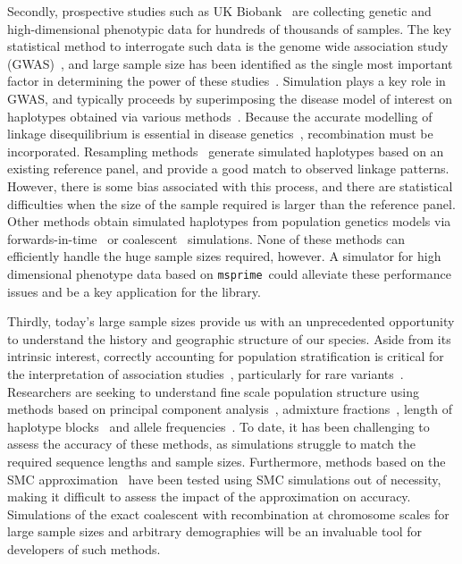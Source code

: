 \documentclass[10pt,letterpaper]{article}
\newcommand{\msprime}[0]{\texttt{msprime}}
\begin{document}
Secondly, prospective studies such as UK Biobank~\citep{c11,lsmj15} are collecting
genetic and high-dimensional phenotypic data  for hundreds of thousands of
samples. The key statistical method to interrogate such data is the genome wide
association study (GWAS)~\citep{m13}, and large sample size has been identified
as the single most important factor in determining the power of these
studies~\citep{ssdm09}. Simulation plays a key role in GWAS, and typically
proceeds by superimposing the disease model of interest on haplotypes obtained
via various methods~\citep{ylgv11}. Because the accurate modelling of linkage
disequilibrium is essential in disease genetics~\citep{sfgrda05},
recombination must be incorporated. Resampling
methods~\citep{mhmmd07,ll08,ssdm09,smd11} generate simulated haplotypes based
on an existing reference panel, and provide a good match to observed linkage
patterns. However, there is some bias associated with this process, and there are
statistical difficulties when the size of the sample required is larger than
the reference panel. Other methods obtain simulated haplotypes from
population genetics models via forwards-in-time~\citep{lisbh08,l14} or
coalescent~\citep{ggs11,cs13} simulations. None of these methods can efficiently
handle the huge sample sizes required, however. A simulator for high dimensional
phenotype data based on \msprime\ could alleviate these performance issues
and be a key application for the library.

Thirdly, today's large sample sizes provide us with an unprecedented
opportunity to understand the history and geographic structure of
our species. Aside from its intrinsic interest, correctly accounting for
population stratification is critical for the interpretation of association
studies~\citep{mclpd04,macglih08}, particularly for rare
variants~\citep{mm12,mm14}. Researchers are seeking to understand fine scale
population structure using methods based on principal component
analysis~\citep{njbk08}, admixture fractions~\citep{anl09,lhmf12,lnlbtb13},
length of haplotype blocks~\citep{rc13,hn13,bekv13} and allele
frequencies~\citep{ghwb09}. To date, it has been challenging to assess the
accuracy of these methods, as simulations struggle to match the required
sequence lengths and sample sizes. Furthermore, methods based on the SMC
approximation~\citep{ld11,sd14} have been tested using SMC simulations out of
necessity, making it difficult to assess the impact of the approximation on
accuracy. Simulations of the exact coalescent with recombination at chromosome
scales for large sample sizes and arbitrary demographies will be an invaluable
tool for developers of such methods.
\end{document}
